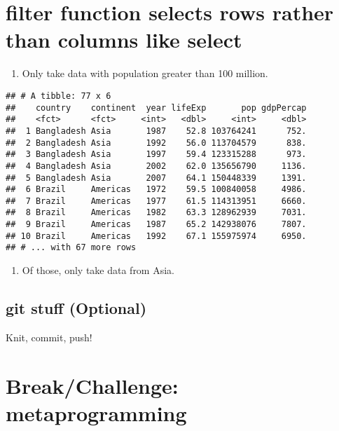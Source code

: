 \documentclass[]{article}
\newenvironment{Shaded}{\begin{snugshade}}{\end{snugshade}}
\newcommand{\KeywordTok}[1]{\textcolor[rgb]{0.13,0.29,0.53}{\textbf{{#1}}}}
\newcommand{\DecValTok}[1]{\textcolor[rgb]{0.00,0.00,0.81}{{#1}}}
\newcommand{\StringTok}[1]{\textcolor[rgb]{0.31,0.60,0.02}{{#1}}}
\newcommand{\NormalTok}[1]{{#1}}
\providecommand{\tightlist}{%
  \setlength{\itemsep}{0pt}\setlength{\parskip}{0pt}}
\begin{document}
\section{filter function selects rows rather than columns like
select}\label{filter-function-selects-rows-rather-than-columns-like-select}

\begin{enumerate}
\def\labelenumi{\arabic{enumi}.}
\tightlist
\item
  Only take data with population greater than 100 million.
\end{enumerate}

\begin{Shaded}
\end{Shaded}

\begin{verbatim}
## # A tibble: 77 x 6
##    country    continent  year lifeExp       pop gdpPercap
##    <fct>      <fct>     <int>   <dbl>     <int>     <dbl>
##  1 Bangladesh Asia       1987    52.8 103764241      752.
##  2 Bangladesh Asia       1992    56.0 113704579      838.
##  3 Bangladesh Asia       1997    59.4 123315288      973.
##  4 Bangladesh Asia       2002    62.0 135656790     1136.
##  5 Bangladesh Asia       2007    64.1 150448339     1391.
##  6 Brazil     Americas   1972    59.5 100840058     4986.
##  7 Brazil     Americas   1977    61.5 114313951     6660.
##  8 Brazil     Americas   1982    63.3 128962939     7031.
##  9 Brazil     Americas   1987    65.2 142938076     7807.
## 10 Brazil     Americas   1992    67.1 155975974     6950.
## # ... with 67 more rows
\end{verbatim}

\begin{enumerate}
\def\labelenumi{\arabic{enumi}.}
\setcounter{enumi}{1}
\tightlist
\item
  Of those, only take data from Asia.
\end{enumerate}

\subsection{git stuff (Optional)}\label{git-stuff-optional}

Knit, commit, push!

\section{Break/Challenge:
metaprogramming}\label{breakchallenge-metaprogramming}
\end{document}
